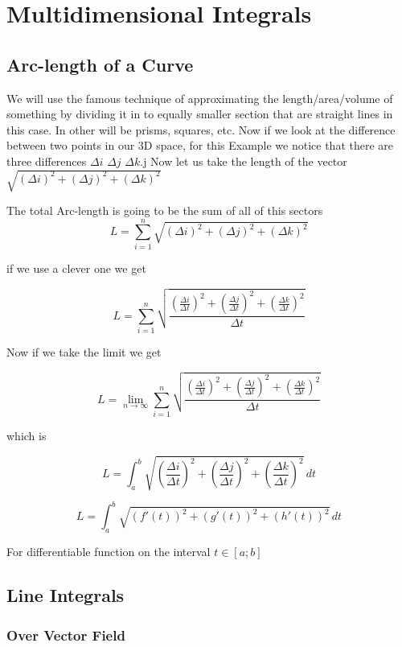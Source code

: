 \newpage
\section{Multidimensional Integrals}

\subsection{Arc-length of a Curve}

We will use the famous technique of approximating the length/area/volume of something
by dividing it in to equally smaller section that are straight lines in this case. In other will
be prisms, squares, etc. Now if we look at the difference between two points in our 3D space, 
for this Example
we notice that there are three differences \(\Delta i\) \(\Delta j\) \(\Delta k\).j
Now let us take the length of the vector \(\sqrt{{(\Delta i)}^2 + {(\Delta j)}^2 + {(\Delta k)}^2}\)

The total Arc-length is going to be the sum of all of this sectors
\[
L =  \sum_{i = 1}^{n}\sqrt{{(\Delta i)}^2 + {(\Delta j)}^2 + {(\Delta k)}^2}
\]

if we use a clever one we get

\[
L =  \sum_{i = 1}^{n}\sqrt{\frac{{\left(\frac{\Delta i}{\Delta t}\right)}^2 + {\left(\frac{\Delta j}{\Delta t}\right)}^2 + {\left(\frac{\Delta k}{\Delta t}\right)}^2}{\Delta t}}
\]

Now if we take the limit we get

\[
L =  \lim_{n\to \infty}\sum_{i = 1}^{n}\sqrt{\frac{{\left(\frac{\Delta i}{\Delta t}\right)}^2 + {\left(\frac{\Delta j}{\Delta t}\right)}^2 + {\left(\frac{\Delta k}{\Delta t}\right)}^2}{\Delta t}}
\]

which is 

\[
L =  \int_{a}^{b}\sqrt{{\left(\frac{\Delta i}{\Delta t}\right)}^2 + {\left(\frac{\Delta j}{\Delta t}\right)}^2 + {\left(\frac{\Delta k}{\Delta t}\right)}^2}\,dt
\]

\[
L =  \int_{a}^{b}\sqrt{{(f'(t))}^2 + {(g'(t))}^2 + {(h'(t))}^2}\,dt
\]

For differentiable function on the interval \(t \in [a; b]\)

\subsection{Line Integrals}

\subsubsection{Over Vector Field}

